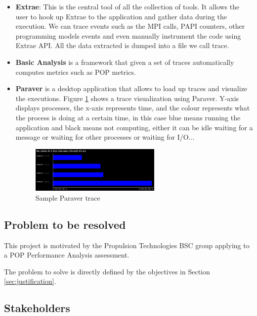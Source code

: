 \begin{itemize}
  \item \textbf{Extrae}\cite{extraeTools}: This is the central tool of all the collection of tools. It allows the user to hook up Extrae to the application and gather data during the execution. We can trace events such as the MPI calls, PAPI\cite{papi}  counters, other programming models events and even manually instrument the code using Extrae API. All the data extracted is dumped into a file we call trace.
  \item \textbf{Basic Analysis} is a framework that given a set of traces automatically computes metrics such as POP metrics.
  \item \textbf{Paraver}\cite{paraverPaper}\cite{paraverWeb} is a desktop application that allows to load up traces and visualize the executions. Figure \ref{fig:trace} shows a trace visualization using Paraver. Y-axis displays processes, the x-axis represents time, and the colour represents what the process is doing at a certain time, in this case blue means running the application and black means not computing, either it can be idle waiting for a message or waiting for other processes or waiting for I/O... 

    \begin{figure}[htbp]
      \centering
      \includegraphics[width=0.6\textwidth]{sample_trace}
      \caption{Sample Paraver trace}
        \label{fig:trace}
    \end{figure}
\end{itemize}

\subsection{Problem to be resolved}
\justify
This project is motivated by the Propulsion Technologies BSC group applying to a POP Performance Analysis assessment.

\justify
The problem to solve is directly defined by the objectives in Section \ref{sec:justification}.

\subsection{Stakeholders}

